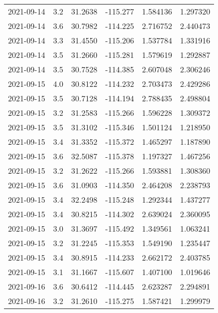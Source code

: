 \begin{tabular}{lrrrrr}
2021-09-14 &       3.2 &  31.2638 &  -115.277 &         1.584136 &         1.297320 \\
2021-09-14 &       3.6 &  30.7982 &  -114.225 &         2.716752 &         2.440473 \\
2021-09-14 &       3.3 &  31.4550 &  -115.206 &         1.537784 &         1.331916 \\
2021-09-14 &       3.5 &  31.2660 &  -115.281 &         1.579619 &         1.292887 \\
2021-09-14 &       3.5 &  30.7528 &  -114.385 &         2.607048 &         2.306246 \\
2021-09-15 &       4.0 &  30.8122 &  -114.232 &         2.703473 &         2.429286 \\
2021-09-15 &       3.5 &  30.7128 &  -114.194 &         2.788435 &         2.498804 \\
2021-09-15 &       3.2 &  31.2583 &  -115.266 &         1.596228 &         1.309372 \\
2021-09-15 &       3.5 &  31.3102 &  -115.346 &         1.501124 &         1.218950 \\
2021-09-15 &       3.4 &  31.3352 &  -115.372 &         1.465297 &         1.187890 \\
2021-09-15 &       3.6 &  32.5087 &  -115.378 &         1.197327 &         1.467256 \\
2021-09-15 &       3.2 &  31.2622 &  -115.266 &         1.593881 &         1.308360 \\
2021-09-15 &       3.6 &  31.0903 &  -114.350 &         2.464208 &         2.238793 \\
2021-09-15 &       3.4 &  32.2498 &  -115.248 &         1.292344 &         1.437277 \\
2021-09-15 &       3.4 &  30.8215 &  -114.302 &         2.639024 &         2.360095 \\
2021-09-15 &       3.0 &  31.3697 &  -115.492 &         1.349561 &         1.063241 \\
2021-09-15 &       3.2 &  31.2245 &  -115.353 &         1.549190 &         1.235447 \\
2021-09-15 &       3.4 &  30.8915 &  -114.233 &         2.662172 &         2.403785 \\
2021-09-15 &       3.1 &  31.1667 &  -115.607 &         1.407100 &         1.019646 \\
2021-09-16 &       3.6 &  30.6412 &  -114.445 &         2.623287 &         2.294891 \\
2021-09-16 &       3.2 &  31.2610 &  -115.275 &         1.587421 &         1.299979 \\

\end{tabular}
